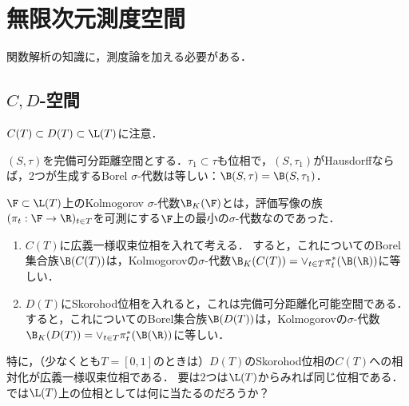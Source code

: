 \documentclass[uplatex,dvipdfmx]{jsreport}
\begin{document}
\section{無限次元測度空間}

\begin{tcolorbox}[colframe=ForestGreen, colback=ForestGreen!10!white,breakable,colbacktitle=ForestGreen!40!white,coltitle=black,fonttitle=\bfseries\sffamily,
title=]
    関数解析の知識に，測度論を加える必要がある．
\end{tcolorbox}

\subsection{$C,D$-空間}

\begin{tcolorbox}[colframe=ForestGreen, colback=ForestGreen!10!white,breakable,colbacktitle=ForestGreen!40!white,coltitle=black,fonttitle=\bfseries\sffamily,
title=]
    $C(T)\subset D(T)\subset\L(T)$に注意．
\end{tcolorbox}

\begin{theorem}[完備可分距離空間のBorel集合族の特徴付け]
    $(S,\tau)$を完備可分距離空間とする．$\tau_1\subset\tau$も位相で，$(S,\tau_1)$がHausdorffならば，2つが生成するBorel $\sigma$-代数は等しい：$\B(S,\tau)=\B(S,\tau_1)$．
\end{theorem}

\begin{theorem}[$C,D$上のBorel集合族の特徴付け]
    $\F\subset \L(T)$上のKolmogorov $\sigma$-代数$\B_K(\F)$とは，評価写像の族$(\pi_t:\F\to\R)_{t\in T}$を可測にする$\F$上の最小の$\sigma$-代数なのであった．
    \begin{enumerate}
        \item $C(T)$に広義一様収束位相を入れて考える．
        すると，これについてのBorel集合族$\B(C(T))$は，Kolmogorovの$\sigma$-代数$\B_K(C(T))=\lor_{t\in T}\pi_t^*(\B(\R))$に等しい．
        \item $D(T)$にSkorohod位相を入れると，これは完備可分距離化可能空間である．すると，これについてのBorel集合族$\B(D(T))$は，Kolmogorovの$\sigma$-代数$\B_K(D(T))=\lor_{t\in T}\pi_t^*(\B(\R))$に等しい．
    \end{enumerate}
\end{theorem}
\begin{remarks}
    特に，（少なくとも$T=[0,1]$のときは）$D(T)$のSkorohod位相の$C(T)$への相対化が広義一様収束位相である．
    要は2つは$\L(T)$からみれば同じ位相である．では$\L(T)$上の位相としては何に当たるのだろうか？
\end{remarks}
\end{document}
